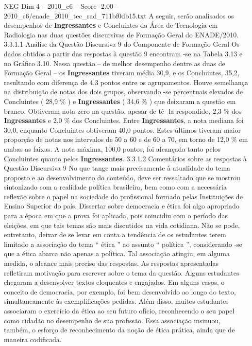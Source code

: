 \begin{textsample}{NEG Dim 4 – 2010\_c6 – Score -2.00 – 2010\_c6/enade\_2010\_tec\_rad\_711bf0db15.txt}
A seguir, serão analisados os desempenhos de \textbf{Ingressantes} e Concluintes da Área de Tecnologia em Radiologia nas duas questões discursivas de Formação Geral do ENADE/2010. 3.3.1.1 Análise da Questão Discursiva 9 do Componente de Formação Geral Os dados obtidos a partir das respostas à questão 9 encontram -se na Tabela 3.13 e no Gráfico 3.10.
Nessa questão – de melhor desempenho dentre as duas de Formação Geral – os \textbf{Ingressantes} tiveram média 30,9, e os Concluintes, 35,2, resultando com diferença de 4,3 pontos entre os agrupamentos.
Houve semelhança na distribuição de notas dos dois grupos, observando -se percentuais elevados de Concluintes ( 28,9 \% ) e \textbf{Ingressantes} ( 34,6 \% ) que deixaram a questão em branco.
Obtiveram nota zero na questão, apesar de tê -la respondido, 2,3 \% dos \textbf{Ingressantes} e 2,0 \% dos Concluintes.
Entre \textbf{Ingressantes}, a nota mediana foi 30,0, enquanto Concluintes obtiveram 40,0 pontos.
Estes últimos tiveram maior proporção de notas nos intervalos de 50 a 60 e de 60 a 70, em torno de 12,0 \% em ambas as faixas.
A nota máxima, 100,0 pontos, foi alcançada tanto pelos Concluintes quanto pelos \textbf{Ingressantes}. 3.3.1.2 Comentários sobre as respostas à Questão Discursiva 9 No que tange mais precisamente à atualidade do tema proposto e ao desenvolvimento do conteúdo, deve ser ressaltado que se mostrou sintonizado com a realidade política brasileira, bem como com a necessária reflexão sobre o papel na sociedade do profissional formado pelas Instituições de Ensino Superior do país.
Dissertar sobre democracia e ética foi algo apropriado para a época em que a prova foi aplicada, pois coincidiu com o período das eleições, em que tais temas são mais discutidos na vida cotidiana.
Não se pode, entretanto, deixar de se levar em conta a tendência de os estudantes terem limitado a associação do tema “ ética ” ao assunto “ política ”, considerando -se que a ética abarca não apenas a política.
Tal associação atingiu, em alguma medida, o alcance mais preciso das respostas.
As respostas apresentadas refletiram motivação para escrever sobre o tema da questão.
Alguns estudantes chegaram a desenvolver textos eloquentes e engajados.
Em alguns casos, o conceito de democracia, por exemplo, foi bem desenvolvido ao longo do texto, simultaneamente às exemplificações pedidas.
Além disso, muitos estudantes associaram o exercício da ética ao seu futuro ofício, reconhecendo o seu papel como cidadão no desempenho de sua profissão.
Essa associação insinuou, também, o esforço de reconhecimento da noção de ética prática, ainda que de maneira codificada.

\end{textsample}
